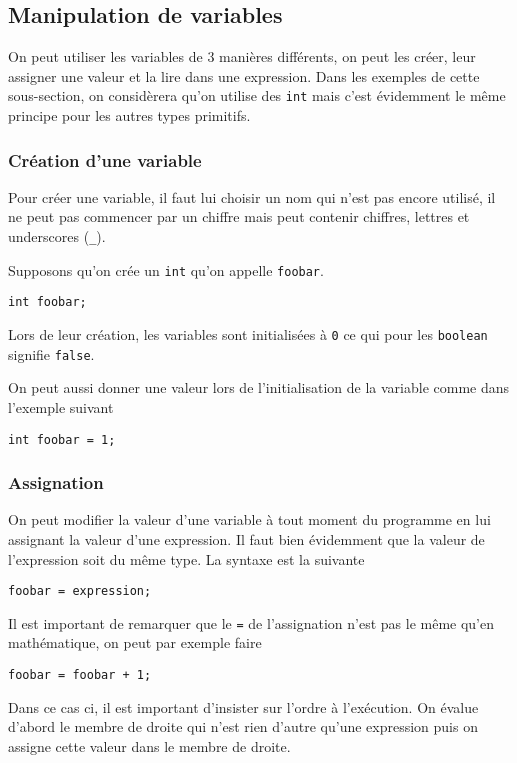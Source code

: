 \subsection{Manipulation de variables}
On peut utiliser les variables de 3 manières différents, on peut les créer,
leur assigner une valeur et la lire dans une expression.
Dans les exemples de cette sous-section, on considèrera qu'on utilise des
\verb|int| mais c'est évidemment le même principe pour les autres types
primitifs.

\subsubsection{Création d'une variable}
Pour créer une variable, il faut lui choisir un nom qui n'est pas encore
utilisé, il ne peut pas commencer par un chiffre mais peut contenir chiffres,
lettres et underscores (\verb|_|).

Supposons qu'on crée un \verb|int| qu'on appelle \verb|foobar|.
\begin{lstlisting}
int foobar;
\end{lstlisting}
Lors de leur création, les variables sont initialisées à \verb|0| ce qui pour
les \verb|boolean| signifie \verb|false|.

On peut aussi donner une valeur lors de l'initialisation de la variable
comme dans l'exemple suivant
\begin{lstlisting}
int foobar = 1;
\end{lstlisting}

\subsubsection{Assignation}
On peut modifier la valeur d'une variable à tout moment du programme en lui
assignant la valeur d'une expression. Il faut bien évidemment que la valeur
de l'expression soit du même type. La syntaxe est la suivante
\begin{lstlisting}
foobar = expression;
\end{lstlisting}

Il est important de remarquer que le \verb|=| de l'assignation n'est pas le
même qu'en mathématique, on peut par exemple faire
\begin{lstlisting}
foobar = foobar + 1;
\end{lstlisting}

Dans ce cas ci, il est important d'insister sur l'ordre à l'exécution.
On évalue d'abord le membre de droite qui n'est rien d'autre qu'une expression
puis on assigne cette valeur dans le membre de droite.

